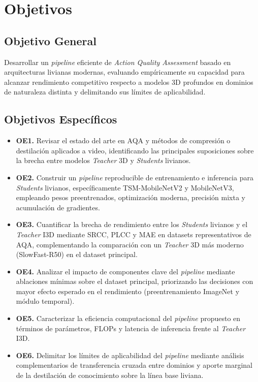 \section{Objetivos}

\subsection{Objetivo General}

Desarrollar un \textit{pipeline} eficiente de \textit{Action Quality Assessment} basado en arquitecturas livianas modernas, evaluando empíricamente su capacidad para alcanzar rendimiento competitivo respecto a modelos 3D profundos en dominios de naturaleza distinta y delimitando sus límites de aplicabilidad.

\subsection{Objetivos Específicos}

\begin{itemize}
  \item \textbf{OE1.} Revisar el estado del arte en \ac{AQA} y métodos de compresión o destilación aplicados a video, identificando las principales suposiciones sobre la brecha entre modelos \textit{Teacher} 3D y \textit{Students} livianos.

  \item \textbf{OE2.} Construir un \textit{pipeline} reproducible de entrenamiento e inferencia para \textit{Students} livianos, específicamente \ac{TSM}-MobileNetV2 y MobileNetV3, empleando pesos preentrenados, optimización moderna, precisión mixta y acumulación de gradientes.

  \item \textbf{OE3.} Cuantificar la brecha de rendimiento entre los \textit{Students} livianos y el \textit{Teacher} \ac{I3D} mediante \ac{SRCC}, \ac{PLCC} y \ac{MAE} en datasets representativos de \ac{AQA}, complementando la comparación con un \textit{Teacher} 3D más moderno (SlowFast-R50) en el dataset principal.

  \item \textbf{OE4.} Analizar el impacto de componentes clave del \textit{pipeline} mediante ablaciones mínimas sobre el dataset principal, priorizando las decisiones con mayor efecto esperado en el rendimiento (preentrenamiento ImageNet y módulo temporal).

  \item \textbf{OE5.} Caracterizar la eficiencia computacional del \textit{pipeline} propuesto en términos de parámetros, \ac{FLOPs} y latencia de inferencia frente al \textit{Teacher} \ac{I3D}.

  \item \textbf{OE6.} Delimitar los límites de aplicabilidad del \textit{pipeline} mediante análisis complementarios de transferencia cruzada entre dominios y aporte marginal de la destilación de conocimiento sobre la línea base liviana.
\end{itemize}

